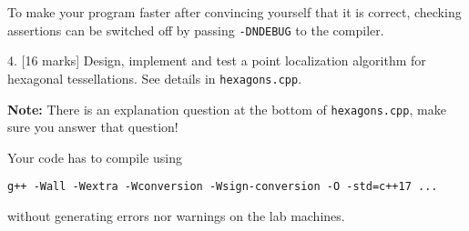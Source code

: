 \documentclass[a4paper,11pt]{article}
\begin{document}
To make your program faster after convincing yourself that it is correct,
checking assertions can be switched off by passing \texttt{-DNDEBUG} to the compiler.

\bigskip

\linerule

\bigskip

4. [16 marks] Design, implement and test a point localization algorithm for
hexagonal tessellations. See details in \texttt{hexagons.cpp}.

\textbf{Note:} There is an explanation question at the bottom of \texttt{hexagons.cpp},
make sure you answer that question!

\medskip 

Your code has to compile using
\begin{center}
    \texttt{g++ -Wall -Wextra -Wconversion -Wsign-conversion -O -std=c++17 ...}
\end{center}
without generating errors nor warnings on the lab machines.
\end{document}
